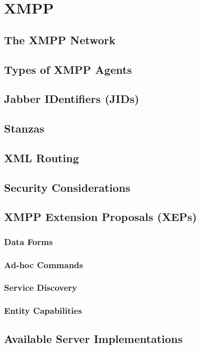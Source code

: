 \chapter{XMPP}

\section{The XMPP Network}

\section{Types of XMPP Agents}

\section{Jabber IDentifiers (JIDs)}

\section{Stanzas}

\section{XML Routing}

\section{Security Considerations}

\section{XMPP Extension Proposals (XEPs)}

\subsection{Data Forms}

\subsection{Ad-hoc Commands}

\subsection{Service Discovery}

\subsection{Entity Capabilities}

\section{Available Server Implementations}
